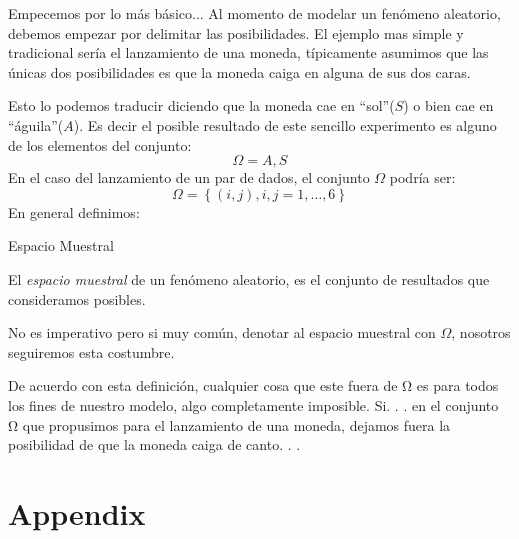 \documentclass[a4paper,12pt,twoside]{libro}
\begin{document}
Empecemos por lo más básico... Al momento de modelar un fenómeno aleatorio, debemos empezar por delimitar las posibilidades. El ejemplo mas simple  y tradicional sería el lanzamiento de una moneda, típicamente asumimos que las únicas dos posibilidades es que la moneda caiga en alguna de sus dos caras.

Esto lo podemos traducir diciendo que la moneda cae en ``sol''($S$) o bien cae en ``águila''($A$). Es decir el posible resultado de este sencillo experimento es alguno de los elementos del conjunto: 
$$\Omega = {A, S}$$
%
En el caso del lanzamiento de un par de dados, el conjunto $\Omega$ podría ser: 
$$\Omega = \left\{(i , j), i , j = 1,\ldots , 6\right\}$$
%
En general definimos:

Espacio Muestral

El \emph{espacio muestral} de un fenómeno aleatorio, es el conjunto de resultados que consideramos posibles.

No es imperativo pero si muy común, denotar al espacio muestral con $\Omega$, nosotros seguiremos esta costumbre.

De acuerdo con esta definición, cualquier cosa que este fuera de Ω es para todos los fines de nuestro modelo, algo completamente imposible. Si. . . en el conjunto Ω que propusimos para el lanzamiento de una moneda, dejamos fuera la posibilidad de que la moneda caiga de canto. . .


\appendix
\chapter{Appendix}

%
%
\end{document}
